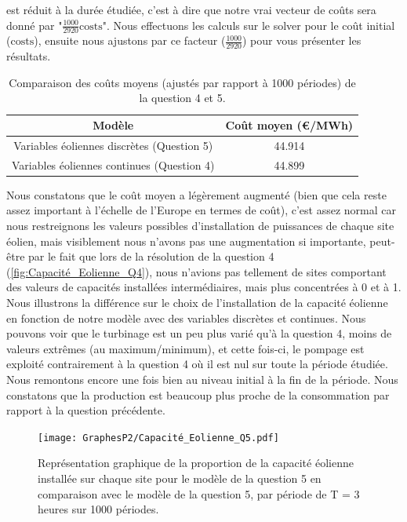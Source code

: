 \documentclass{article}
\begin{document}
est réduit à la durée étudiée, c'est à dire que notre vrai vecteur de coûts sera donné par "$\frac{1000}{2920} \mathrm{costs}$".
Nous effectuons les calculs sur le solver pour le coût initial ($\mathrm{costs}$), ensuite nous ajustons 
par ce facteur ($\frac{1000}{2920}$) pour vous présenter les résultats.
\begin{table}[H]
    \centering
    \renewcommand{\arraystretch}{1.5}%
    \begin{tabular}{|c | c |} 
        \hline
        Modèle & Coût moyen (€/MWh) \\
        \hline
        Variables éoliennes discrètes (Question 5) & 44.914 \\
        \hline
        Variables éoliennes continues (Question 4) & 44.899 \\
        \hline
    \end{tabular}
    \caption{Comparaison des coûts moyens (ajustés par rapport à 1000 périodes) de la question 4 et 5.}
    \label{table:comparaison_resultat_Q5_Q4_1000}
\end{table} 
\noindent Nous constatons que le coût moyen a légèrement augmenté (bien que cela reste assez important à l'échelle
de l'Europe en termes de coût), c'est assez normal car nous restreignons les valeurs possibles d'installation 
de puissances de chaque site éolien, mais visiblement nous n'avons pas une augmentation si importante, peut-être par le fait 
que lors de la résolution de la question 4 (\autoref{fig:Capacité_Eolienne_Q4}), nous n'avions pas tellement de sites
comportant des valeurs de capacités installées intermédiaires, mais plus concentrées à 0 et à 1. Nous illustrons la différence sur le choix de l'installation 
de la capacité éolienne en fonction de notre modèle avec des variables discrètes et continues. Nous pouvons voir que le turbinage est un peu plus varié qu'à la question 4, moins de valeurs extrêmes (au maximum/minimum), et cette fois-ci,
le pompage est exploité contrairement à la question 4 où il est nul sur toute la période étudiée. 
Nous remontons encore une fois bien au niveau initial à la fin de la période.  
Nous constatons que la production est beaucoup plus proche de la consommation par rapport à la question précédente.
\begin{figure}[h!]
    \centering
    \texttt{[image: GraphesP2/Capacité\_Eolienne\_Q5.pdf]}
    \caption{Représentation graphique de la proportion de la capacité éolienne installée sur chaque site pour le modèle de la question 5 en comparaison
    avec le modèle de la question 5, par période
    de T = 3 heures sur 1000 périodes.}
    \label{fig:Capacité_Eolienne_Q5}
\end{figure}
\end{document}
